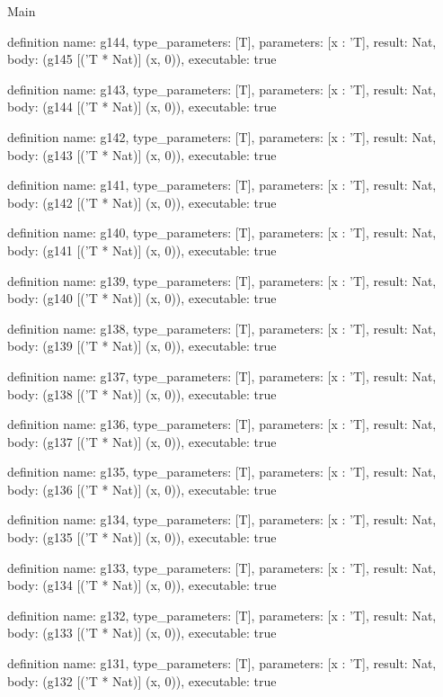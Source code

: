 \begin{lexlean}{Main}
\begin{semanticmodule}
definition{
  name: g144,
  type_parameters: [T],
  parameters: [x : 'T],
  result: Nat,
  body: (g145 [('T * Nat)] (x, 0)),
  executable: true
}

definition{
  name: g143,
  type_parameters: [T],
  parameters: [x : 'T],
  result: Nat,
  body: (g144 [('T * Nat)] (x, 0)),
  executable: true
}

definition{
  name: g142,
  type_parameters: [T],
  parameters: [x : 'T],
  result: Nat,
  body: (g143 [('T * Nat)] (x, 0)),
  executable: true
}

definition{
  name: g141,
  type_parameters: [T],
  parameters: [x : 'T],
  result: Nat,
  body: (g142 [('T * Nat)] (x, 0)),
  executable: true
}

definition{
  name: g140,
  type_parameters: [T],
  parameters: [x : 'T],
  result: Nat,
  body: (g141 [('T * Nat)] (x, 0)),
  executable: true
}

definition{
  name: g139,
  type_parameters: [T],
  parameters: [x : 'T],
  result: Nat,
  body: (g140 [('T * Nat)] (x, 0)),
  executable: true
}

definition{
  name: g138,
  type_parameters: [T],
  parameters: [x : 'T],
  result: Nat,
  body: (g139 [('T * Nat)] (x, 0)),
  executable: true
}

definition{
  name: g137,
  type_parameters: [T],
  parameters: [x : 'T],
  result: Nat,
  body: (g138 [('T * Nat)] (x, 0)),
  executable: true
}

definition{
  name: g136,
  type_parameters: [T],
  parameters: [x : 'T],
  result: Nat,
  body: (g137 [('T * Nat)] (x, 0)),
  executable: true
}

definition{
  name: g135,
  type_parameters: [T],
  parameters: [x : 'T],
  result: Nat,
  body: (g136 [('T * Nat)] (x, 0)),
  executable: true
}

definition{
  name: g134,
  type_parameters: [T],
  parameters: [x : 'T],
  result: Nat,
  body: (g135 [('T * Nat)] (x, 0)),
  executable: true
}

definition{
  name: g133,
  type_parameters: [T],
  parameters: [x : 'T],
  result: Nat,
  body: (g134 [('T * Nat)] (x, 0)),
  executable: true
}

definition{
  name: g132,
  type_parameters: [T],
  parameters: [x : 'T],
  result: Nat,
  body: (g133 [('T * Nat)] (x, 0)),
  executable: true
}

definition{
  name: g131,
  type_parameters: [T],
  parameters: [x : 'T],
  result: Nat,
  body: (g132 [('T * Nat)] (x, 0)),
  executable: true
}


\end{semanticmodule}
\end{lexlean}
